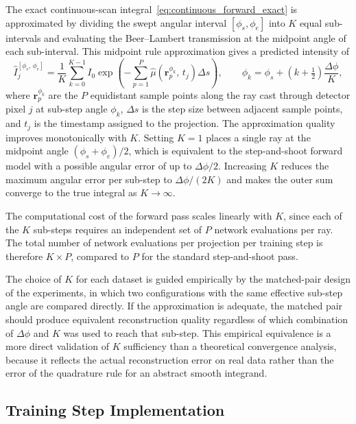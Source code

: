 \documentclass[12pt, a4paper, twoside]{report}
\newcommand{\muhat}{\hat{\mu}}
\begin{document}
The exact continuous-scan integral~\ref{eq:continuous_forward_exact} is approximated by dividing the swept angular interval $[\phi_s, \phi_e]$ into $K$ equal sub-intervals and evaluating the Beer--Lambert transmission at the midpoint angle of each sub-interval. This midpoint rule approximation gives a predicted intensity of
%
\begin{equation}
    \hat{I}_j^{[\phi_s,\,\phi_e]} = \frac{1}{K} \sum_{k=0}^{K-1}
        I_0 \exp\!\left(-\sum_{p=1}^{P} \muhat\!\left(\mathbf{r}_p^{\phi_k},\, t_j\right) \Delta s\right),
    \qquad
    \phi_k = \phi_s + \left(k + \tfrac{1}{2}\right)\frac{\Delta\phi}{K},
    \label{eq:continuous_forward_discrete}
\end{equation}
%
where $\mathbf{r}_p^{\phi_k}$ are the $P$ equidistant sample points along the ray cast through detector pixel $j$ at sub-step angle $\phi_k$, $\Delta s$ is the step size between adjacent sample points, and $t_j$ is the timestamp assigned to the projection. The approximation quality improves monotonically with $K$. Setting $K = 1$ places a single ray at the midpoint angle $(\phi_s + \phi_e)/2$, which is equivalent to the step-and-shoot forward model with a possible angular error of up to $\Delta\phi/2$. Increasing $K$ reduces the maximum angular error per sub-step to $\Delta\phi / (2K)$ and makes the outer sum converge to the true integral as $K \to \infty$.

The computational cost of the forward pass scales linearly with $K$, since each of the $K$ sub-steps requires an independent set of $P$ network evaluations per ray. The total number of network evaluations per projection per training step is therefore $K \times P$, compared to $P$ for the standard step-and-shoot pass.

The choice of $K$ for each dataset is guided empirically by the matched-pair design of the experiments, in which two configurations with the same effective sub-step angle are compared directly. If the approximation is adequate, the matched pair should produce equivalent reconstruction quality regardless of which combination of $\Delta\phi$ and $K$ was used to reach that sub-step. This empirical equivalence is a more direct validation of $K$ sufficiency than a theoretical convergence analysis, because it reflects the actual reconstruction error on real data rather than the error of the quadrature rule for an abstract smooth integrand.

\subsection{Training Step Implementation}
\label{subsec:cont_implementation}
\end{document}

